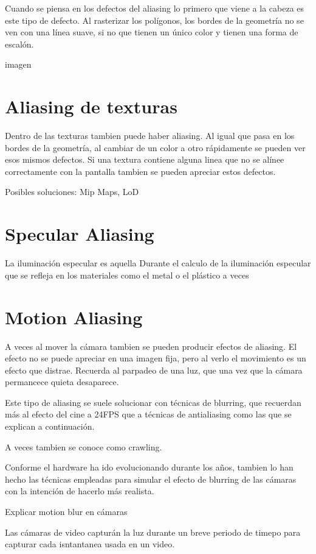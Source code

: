 \documentclass[withindex, glossary]{cam-thesis}
\begin{document}
Cuando se piensa en los defectos del aliasing lo primero que viene a la cabeza es este tipo de defecto. Al rasterizar los polígonos, los bordes de la geometría no se ven con una línea suave, si no que tienen un único color y tienen una forma de escalón.

imagen

\section{Aliasing de texturas}

Dentro de las texturas tambien puede haber aliasing. Al igual que pasa en los bordes de la geometría, al cambiar de un color a otro rápidamente se pueden ver esos mismos defectos. Si una textura contiene alguna linea que no se alínee correctamente con la pantalla tambien se pueden apreciar estos defectos.

Posibles soluciones: Mip Maps, LoD

\section{Specular Aliasing}

La iluminación especular es aquella 
Durante el calculo de la iluminación especular que se refleja en los materiales como el metal o el plástico a veces

\section{Motion Aliasing}

A veces al mover la cámara tambien se pueden producir efectos de aliasing. El efecto no se puede apreciar en una imagen fija, pero al verlo el movimiento es un efecto que distrae. Recuerda al parpadeo de una luz, que una vez que la cámara permancece quieta desaparece.

Este tipo de aliasing se suele solucionar con técnicas de blurring, que recuerdan más al efecto del cine a 24FPS que a técnicas de antialiasing como las que se explican a continuación.

A veces tambien se conoce como crawling.

Conforme el hardware ha ido evolucionando durante los años, tambien lo han hecho las técnicas empleadas para simular el efecto de blurring de las cámaras con la intención de hacerlo más realista.

Explicar motion blur en cámaras

Las cámaras de video capturán la luz durante un breve periodo de timepo para capturar cada isntantanea usada en un video. 
\end{document}
